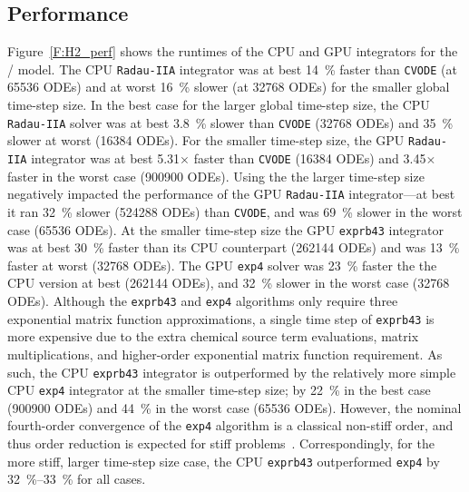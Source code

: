 \documentclass[preprint]{elsarticle}
\begin{document}
\subsection{Performance}

Figure~\ref{F:H2_perf} shows the runtimes of the CPU and GPU integrators for the \slash{} model.
The CPU \texttt{Radau-IIA} integrator was at best \SI{14}{\percent} faster than \texttt{CVODE} (at \num{65536} ODEs) and at worst \SI{16}{\percent} slower (at \num{32768} ODEs) for the smaller global time-step size.
In the best case for the larger global time-step size, the CPU \texttt{Radau-IIA} solver was at best \SI{3.8}{\percent} slower than \texttt{CVODE} (\num{32768} ODEs) and \SI{35}{\percent} slower at worst (\num{16384} ODEs).
For the smaller time-step size, the GPU \texttt{Radau-IIA} integrator was at best \num{5.31}$\times$ faster than \texttt{CVODE} (\num{16384} ODEs) and \num{3.45}$\times$ faster in the worst case (\num{900900} ODEs).
Using the the larger time-step size negatively impacted the performance of the GPU \texttt{Radau-IIA} integrator---at best it ran \SI{32}{\percent} slower (\num{524288} ODEs) than \texttt{CVODE}, and was \SI{69}{\percent} slower in the worst case (\num{65536} ODEs).
At the smaller time-step size the GPU \texttt{exprb43} integrator was at best \SI{30}{\percent} faster than its CPU counterpart (\num{262144} ODEs) and was \SI{13}{\percent} faster at worst (\num{32768} ODEs). 
The GPU \texttt{exp4} solver was \SI{23}{\percent} faster the the CPU version at best (\num{262144} ODEs), and \SI{32}{\percent} slower in the worst case (\num{32768} ODEs).
Although the \texttt{exprb43} and \texttt{exp4} algorithms only require three exponential matrix function approximations, a single time step of \texttt{exprb43} is more expensive due to the extra chemical source term evaluations, matrix multiplications, and higher-order exponential matrix function requirement.
As such, the CPU \texttt{exprb43} integrator is outperformed by the relatively more simple CPU \texttt{exp4} integrator at the smaller time-step size; by \SI{22}{\percent} in the best case (\num{900900} ODEs) and \SI{44}{\percent} in the worst case (\num{65536} ODEs).
However, the nominal fourth-order convergence of the \texttt{exp4} algorithm is a classical non-stiff order, and thus order reduction is expected for stiff problems~\cite{ANU:7701740,Bisetti:2012jw}.
Correspondingly, for the more stiff, larger time-step size case, the CPU \texttt{exprb43} outperformed \texttt{exp4} by \SIrange{32}{33}{\percent} for all cases.
\end{document}
